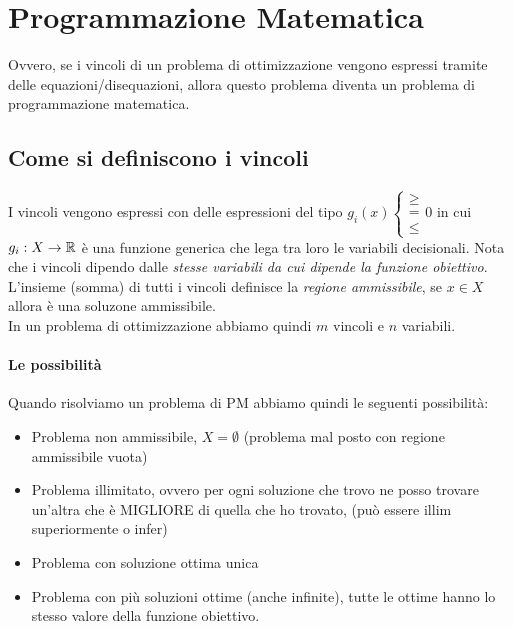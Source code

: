 \documentclass[12pt, a4paper, openany]{book}
\begin{document}
\section{Programmazione Matematica}
Ovvero, se i vincoli di un problema di ottimizzazione vengono espressi tramite delle equazioni/disequazioni, allora questo problema diventa un problema di programmazione matematica.

\subsection*{Come si definiscono i vincoli}
I vincoli vengono espressi con delle espressioni del tipo $g_i(x) \begin{cases}
    \geq \\ = \\ \leq %
\end{cases} 0$
in cui $g_i: X\to \mathbb{R}$ è una funzione generica che lega tra loro le variabili decisionali.
Nota che i vincoli dipendo dalle \emph{stesse variabili da cui dipende la funzione obiettivo}.
\\L'insieme (somma) di tutti i vincoli definisce la \emph{regione ammissibile}, se $x \in X$ allora è una soluzone ammissibile.
\\In un problema di ottimizzazione abbiamo quindi $m$ vincoli e $n$ variabili.

\paragraph*{Le possibilità} Quando risolviamo un problema di PM abbiamo quindi le seguenti possibilità:
\begin{itemize}
    \item Problema non ammissibile, $X = \emptyset$ (problema mal posto con regione ammissibile vuota)
    \item Problema illimitato, ovvero per ogni soluzione che trovo ne posso trovare un'altra che è MIGLIORE di quella che ho trovato, (può essere illim superiormente o infer)
    \item Problema con soluzione ottima unica
    \item Problema con più soluzioni ottime (anche infinite), tutte le ottime hanno lo stesso valore della funzione obiettivo.
\end{itemize}
\end{document}

